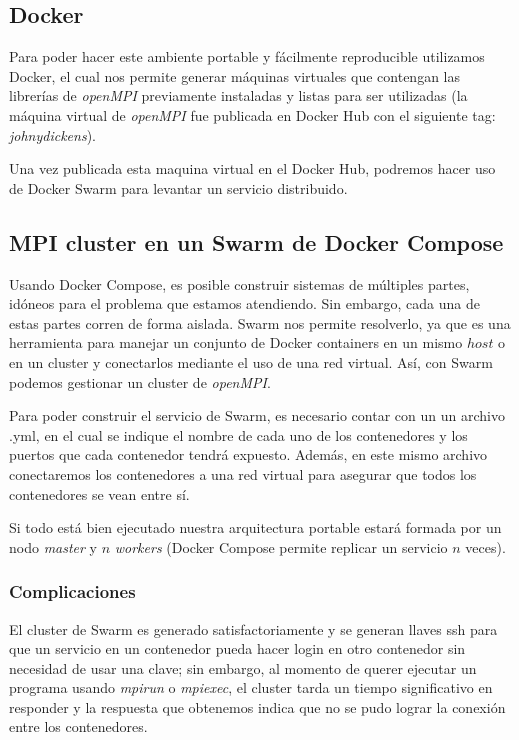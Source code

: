 \documentclass[DIV=calc, paper=letter, fontsize=11pt, twocolumn]{scrartcl}
\begin{document}
\subsection{Docker}

Para poder hacer este ambiente portable y fácilmente reproducible utilizamos Docker, el cual nos permite generar máquinas virtuales que contengan las librerías de \textit{openMPI} previamente instaladas y listas para ser utilizadas (la máquina virtual de \textit{openMPI} fue publicada en Docker Hub con el siguiente tag: \textit{johnydickens\openmpi}).

Una vez publicada esta maquina virtual en el Docker Hub, podremos hacer uso de Docker Swarm para levantar un servicio distribuido.

\subsection{MPI cluster en un Swarm de Docker Compose}

Usando Docker Compose, es posible construir sistemas de múltiples partes, idóneos para el problema que estamos atendiendo. Sin embargo, cada una de estas partes corren de forma aislada. Swarm nos permite resolverlo, ya que es una herramienta para manejar un conjunto de Docker containers en un mismo $host$ o en un cluster y conectarlos mediante el uso de una red virtual. Así, con Swarm podemos gestionar un cluster de \textit{openMPI}.

Para poder construir el servicio de Swarm, es necesario contar con un un archivo .yml, en el cual se indique el nombre de cada uno de los contenedores y los puertos que cada contenedor tendrá expuesto. Además, en este mismo archivo conectaremos los contenedores a una red virtual para asegurar que todos los contenedores se vean entre sí.

Si todo está bien ejecutado nuestra arquitectura portable estará formada por un nodo \textit{master} y $n$ \textit{workers} (Docker Compose permite replicar un servicio $n$ veces). 

\subsubsection{Complicaciones}

El cluster de Swarm es generado satisfactoriamente y se generan llaves ssh para que un servicio en un contenedor pueda hacer login en otro contenedor sin necesidad de usar una clave; sin embargo, al momento de querer ejecutar un programa usando \textit{mpirun} o \textit{mpiexec}, el cluster tarda un tiempo significativo en responder y la respuesta que obtenemos indica que no se pudo lograr la conexión entre los contenedores.
\end{document}
